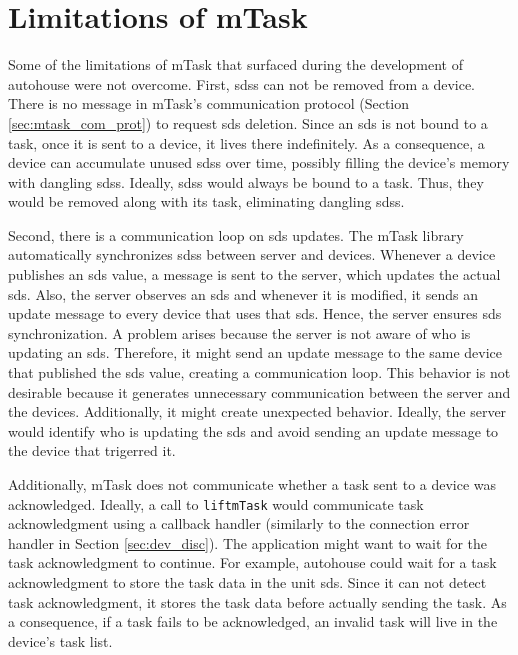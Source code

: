 \section{Limitations of mTask}\label{sec:limitations}
Some of the limitations of \gls{mTask} that surfaced during the development of \gls{autohouse} were not overcome. First, \acsp{sds} can not be removed from a device. There is no message in \gls{mTask}'s communication protocol (Section \ref{sec:mtask_com_prot}) to request \acs{sds} deletion. Since an \acs{sds} is not bound to a task, once it is sent to a device, it lives there indefinitely. As a consequence, a device can accumulate unused \acsp{sds} over time, possibly filling the device's memory with dangling \acsp{sds}. Ideally, \acsp{sds} would always be bound to a task. Thus, they would be removed along with its task, eliminating dangling \acsp{sds}. 

Second, there is a communication loop on \acs{sds} updates. The \gls{mTask} library automatically synchronizes \acsp{sds} between server and devices. Whenever a device publishes an \ac{sds} value, a message is sent to the server, which updates the actual \acs{sds}. Also, the server observes an \acs{sds} and whenever it is modified, it sends an update message to every device that uses that \acs{sds}. Hence, the server ensures \acs{sds} synchronization. A problem arises because the server is not aware of who is updating an \ac{sds}. Therefore, it might send an update message to the same device that published the \ac{sds} value, creating a communication loop. This behavior is not desirable because it generates unnecessary communication between the server and the devices. Additionally, it might create unexpected behavior. Ideally, the server would identify who is updating the \acs{sds} and avoid sending an update message to the device that trigerred it.

Additionally, \gls{mTask} does not communicate whether a task sent to a device was acknowledged. Ideally, a call to \texttt{liftmTask} would communicate task acknowledgment using a callback handler (similarly to the connection error handler in Section \ref{sec:dev_disc}). The application might want to wait for the task acknowledgment to continue. For example, \gls{autohouse} could wait for a task acknowledgment to store the task data in the unit \acs{sds}. Since it can not detect task acknowledgment, it stores the task data before actually sending the task. As a consequence, if a task fails to be acknowledged, an invalid task will live in the device's task list.


